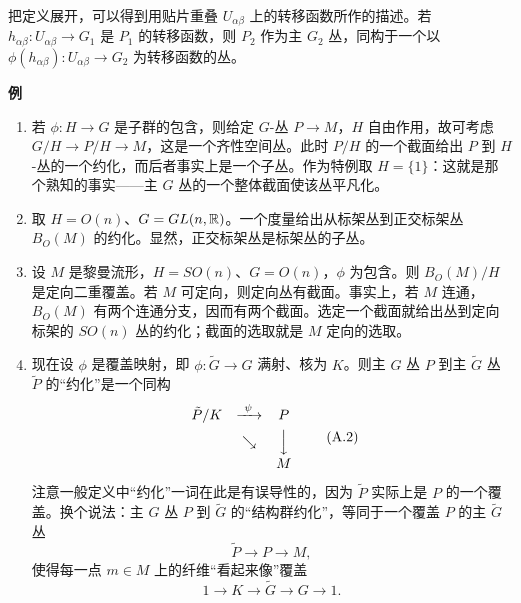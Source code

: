 把定义展开，可以得到用贴片重叠 $U_{\alpha\beta}$ 上的转移函数所作的描述。若 $h_{\alpha\beta}:U_{\alpha\beta}\to G_{1}$ 是 $P_{1}$ 的转移函数，则 $P_{2}$ 作为主 $G_{2}$ 丛，同构于一个以 $\phi(h_{\alpha\beta}):U_{\alpha\beta}\to G_{2}$ 为转移函数的丛。


\medskip
\noindent\textbf{例}

\begin{enumerate}[label=\arabic*., leftmargin=2.1em]
\item 若 $\phi:H\to G$ 是子群的包含，则给定 $G$-丛 $P\to M$，$H$ 自由作用，故可考虑 $G/H\to P/H\to M$，这是一个齐性空间丛。此时 $P/H$ 的一个截面给出 $P$ 到 $H$-丛的一个约化，而后者事实上是一个子丛。作为特例取 $H=\{1\}$：这就是那个熟知的事实——主 $G$ 丛的一个整体截面使该丛平凡化。

\item 取 $H=O(n)$、$G=GL(n,\mathbb{R})$。一个度量给出从标架丛到正交标架丛 $B_{O}(M)$ 的约化。显然，正交标架丛是标架丛的子丛。

\item 设 $M$ 是黎曼流形，$H=SO(n)$、$G=O(n)$，$\phi$ 为包含。则 $B_{O}(M)/H$ 是定向二重覆盖。若 $M$ 可定向，则定向丛有截面。事实上，若 $M$ 连通，$B_{O}(M)$ 有两个连通分支，因而有两个截面。选定一个截面就给出丛到定向标架的 $SO(n)$ 丛的约化；截面的选取就是 $M$ 定向的选取。

\item 现在设 $\phi$ 是覆盖映射，即 $\phi:\tilde G\to G$ 满射、核为 $K$。则主 $G$ 丛 $P$ 到主 $\tilde G$ 丛 $\tilde P$ 的“约化”是一个同构
\begin{equation}
\begin{array}{ccc}
\tilde P/K & \xrightarrow{\ \psi\ } & P\\[4pt]
 & \searrow & {\Big\downarrow}\\[4pt]
 & & M
\end{array}
\tag{A.2}
\end{equation}
注意一般定义中“约化”一词在此是有误导性的，因为 $\tilde P$ 实际上是 $P$ 的一个覆盖。换个说法：主 $G$ 丛 $P$ 到 $\tilde G$ 的“结构群约化”，等同于一个覆盖 $P$ 的主 $\tilde G$ 丛
\begin{equation}
\tilde P\to P\to M,
\tag{A.3}
\end{equation}
使得每一点 $m\in M$ 上的纤维“看起来像”覆盖
\begin{equation}
1\to K\to\tilde G\to G\to1.
\tag{A.4}
\end{equation}


\end{enumerate}
